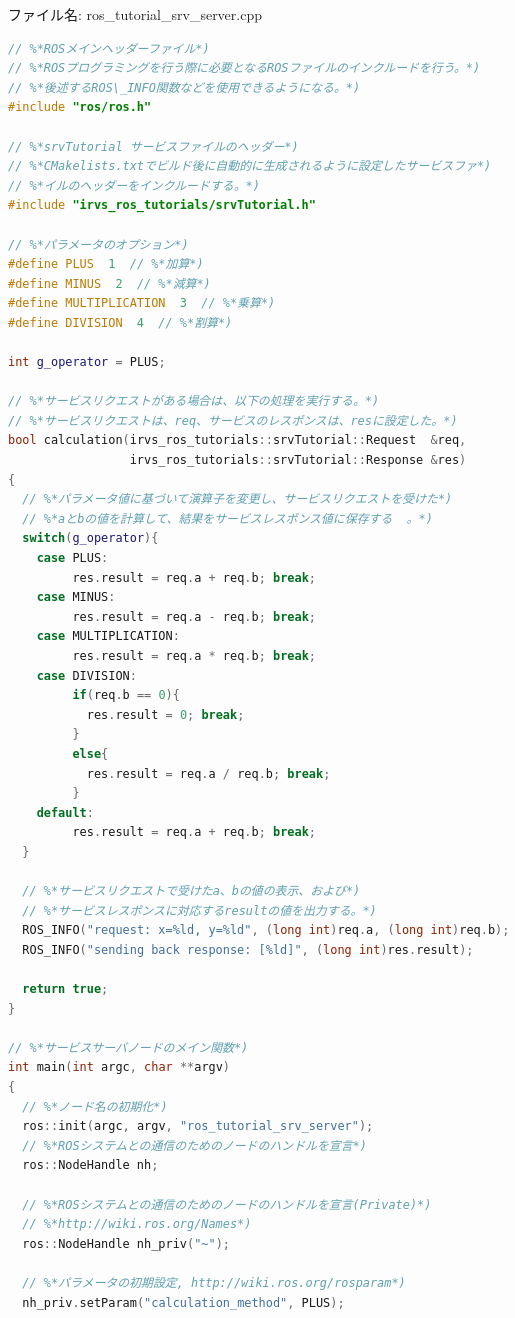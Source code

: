 ファイル名: ros\_tutorial\_srv\_server.cpp
\begin{lstlisting}[language=C++]
// %*ROSメインヘッダーファイル*)
// %*ROSプログラミングを行う際に必要となるROSファイルのインクルードを行う。*)
// %*後述するROS\_INFO関数などを使用できるようになる。*)
#include "ros/ros.h"

// %*srvTutorial サービスファイルのヘッダー*)
// %*CMakelists.txtでビルド後に自動的に生成されるように設定したサービスファ*)
// %*イルのヘッダーをインクルードする。*)
#include "irvs_ros_tutorials/srvTutorial.h"

// %*パラメータのオプション*)
#define PLUS  1  // %*加算*)
#define MINUS  2  // %*減算*)
#define MULTIPLICATION  3  // %*乗算*)
#define DIVISION  4  // %*割算*)

int g_operator = PLUS;

// %*サービスリクエストがある場合は、以下の処理を実行する。*)
// %*サービスリクエストは、req、サービスのレスポンスは、resに設定した。*)
bool calculation(irvs_ros_tutorials::srvTutorial::Request  &req,
                 irvs_ros_tutorials::srvTutorial::Response &res)
{
  // %*パラメータ値に基づいて演算子を変更し、サービスリクエストを受けた*)
  // %*aとbの値を計算して、結果をサービスレスポンス値に保存する  。*)
  switch(g_operator){
    case PLUS:
         res.result = req.a + req.b; break;
    case MINUS:
         res.result = req.a - req.b; break;
    case MULTIPLICATION:
         res.result = req.a * req.b; break;
    case DIVISION:
         if(req.b == 0){
           res.result = 0; break;
         }
         else{
           res.result = req.a / req.b; break;
         }
    default:
         res.result = req.a + req.b; break;
  }

  // %*サービスリクエストで受けたa、bの値の表示、および*)
  // %*サービスレスポンスに対応するresultの値を出力する。*)
  ROS_INFO("request: x=%ld, y=%ld", (long int)req.a, (long int)req.b);
  ROS_INFO("sending back response: [%ld]", (long int)res.result);

  return true;
}

// %*サービスサーバノードのメイン関数*)
int main(int argc, char **argv)
{
  // %*ノード名の初期化*)
  ros::init(argc, argv, "ros_tutorial_srv_server");
  // %*ROSシステムとの通信のためのノードのハンドルを宣言*)
  ros::NodeHandle nh;

  // %*ROSシステムとの通信のためのノードのハンドルを宣言(Private)*)
  // %*http://wiki.ros.org/Names*)
  ros::NodeHandle nh_priv("~");

  // %*パラメータの初期設定, http://wiki.ros.org/rosparam*)
  nh_priv.setParam("calculation_method", PLUS);


\end{lstlisting}
